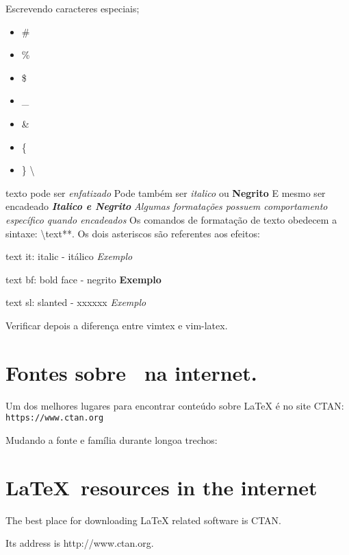 \documentclass{article}
\begin{document}
Escrevendo caracteres especiais;
\begin{itemize}
        \item \#
        \item \%
        \item \$
        \item \_
        \item \&
        \item \{
        \item \}
        \textbackslash

\end{itemize}

texto pode ser \emph{enfatizado}
Pode também ser \textit{italico} ou \textbf{Negrito}
E mesmo ser encadeado \textbf{\textit{Italico e Negrito}}
\emph{Algumas formatações possuem \emph{comportamento específico} quando encadeados}
Os comandos de formatação de texto obedecem a sintaxe: 
\backslash text**. Os dois asteriscos são referentes aos efeitos:
\begin{intemize}
\item{text it: italic - itálico}
    \textit{Exemplo}
\item{text bf: bold face - negrito}
    \textbf{Exemplo}
\item{text sl: slanted - xxxxxx}
    \textsl{Exemplo}
\end{intemize}

Verificar depois a diferença entre vimtex e vim-latex.

\section{\textsf{Fontes sobre \latex\ na internet.}}
Um dos melhores lugares para encontrar conteúdo sobre LaTeX é no site CTAN:
\texttt{https://www.ctan.org}



Mudando a fonte e família durante longoa trechos:

\section{\sffamily\LaTeX\ resources in the internet}

The best place for downloading LaTeX related software is CTAN.

Its address is \ttfamily http://www.ctan.org\rmfamily.
\end{document}
